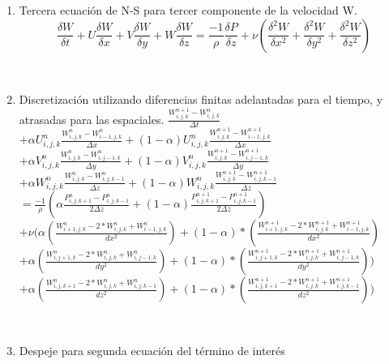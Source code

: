 \documentclass[a4paper]{article}
\begin{document}
\begin{enumerate}

\item Tercera ecuación de N-S para tercer componente de la velocidad W.
$$ \frac{\delta W}{\delta t} + U \frac{\delta W}{\delta x} + V \frac{\delta W}{\delta y} + W \frac{\delta W}{\delta z} =  \frac{-1}{\rho} \frac{\delta P}{\delta z} + \nu (\frac{{\delta}^{2} W}{\delta {x}^{2}} + \frac{{\delta}^{2} W}{\delta {y}^{2}} + \frac{{\delta}^{2} W}{\delta {z}^{2}}) $$

~\\

\item Discretización utilizando diferencias finitas adelantadas para el tiempo, y atrasadas para las espaciales.
$ \frac{ {W}^{n+1}_{i,j,k} - W^{n}_{i,j,k}}{ \Delta t} $
$+ \alpha {U}^{n}_{i,j,k} \frac{ {W}^{n}_{i,j,k} - W^{n}_{i-1,j,k}}{\Delta x} + (1 - \alpha) {U}^{n}_{i,j,k} \frac{ {W}^{n+1}_{i,j,k} - W^{n+1}_{i-1,j,k}}{ \Delta x}$ 
\\
$+ \alpha {V}^{n}_{i,j,k} \frac{ {W}^{n}_{i,j,k} - W^{n}_{i,j-1,k}}{ \Delta y} + (1 - \alpha) {V}^{n}_{i,j,k} \frac{ {W}^{n+1}_{i,j,k} - W^{n+1}_{i,j-1,k}}{ \Delta y}$
\\
$+ \alpha {W}^{n}_{i,j,k} \frac{ {W}^{n}_{i,j,k} - W^{n}_{i,j,k-1}}{ \Delta z} + (1 - \alpha) {W}^{n}_{i,j,k} \frac{ {W}^{n+1}_{i,j,k} - W^{n+1}_{i,j,k-1}}{ \Delta z}$
\\
$= \frac{-1}{\rho} ( \alpha \frac{P^{n}_{i,j,k+1} - P^{n}_{i,j,k-1} }{ 2 \Delta z } + (1 - \alpha) \frac{P^{n+1}_{i,j,k+1} - P^{n+1}_{i,j,k-1} }{ 2 \Delta z })  $
\\
$+ \nu (\alpha (\frac{ W^{n}_{i+1,j,k} - 2*W^{n}_{i,j,k} + W^{n}_{i-1,j,k}}{dx^2}) + (1-\alpha)*(\frac{ W^{n+1}_{i+1,j,k} - 2*W^{n+1}_{i,j,k} + W^{n+1}_{i-1,j,k}}{dx^2})$
\\
$+ \alpha (\frac{ W^{n}_{i,j+1,k} - 2*W^{n}_{i,j,k} + W^{n}_{i,j-1,k}}{dy^2}) + (1-\alpha)*(\frac{ W^{n+1}_{i,j+1,k} - 2*W^{n+1}_{i,j,k} + W^{n+1}_{i,j-1,k}}{dy^2}))$
\\
$ + \alpha (\frac{ W^{n}_{i,j,k+1} - 2*W^{n}_{i,j,k} + W^{n}_{i,j,k-1}}{dz^2}) + (1-\alpha)*(\frac{ W^{n+1}_{i,j,k+1} - 2*W^{n+1}_{i,j,k} + W^{n+1}_{i,j,k-1}}{dz^2})) $

~\\

\item Despeje para segunda ecuación del término de interés


\end{enumerate}
\end{document}
